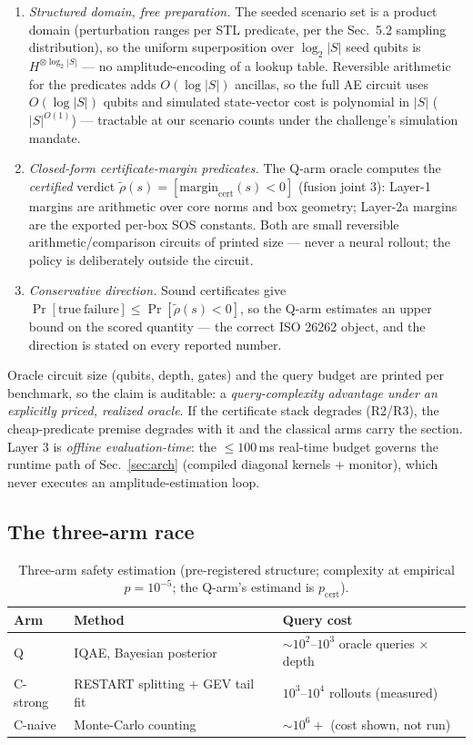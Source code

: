 \documentclass[conference,10pt]{IEEEtran}
\begin{document}
\begin{enumerate}
\item \emph{Structured domain, free preparation.} The seeded scenario set is a
product domain (perturbation ranges per STL predicate, per the Sec.~5.2
sampling distribution), so the uniform superposition over $\log_2|S|$ seed
qubits is $H^{\otimes\log_2|S|}$ --- no amplitude-encoding of a lookup table.
Reversible arithmetic for the predicates adds $O(\log|S|)$ ancillas, so the
full AE circuit uses $O(\log|S|)$ qubits and simulated state-vector cost is
polynomial in $|S|$ ($|S|^{O(1)}$) --- tractable at our scenario counts under
the challenge's simulation mandate.
\item \emph{Closed-form certificate-margin predicates.} The Q-arm oracle
computes the \emph{certified} verdict $\tilde\rho(s) =
[\mathrm{margin}_{\mathrm{cert}}(s) < 0]$ (fusion joint 3): Layer-1 margins
are arithmetic over core norms and box geometry; Layer-2a margins are the
exported per-box SOS constants. Both are small reversible
arithmetic/comparison circuits of printed size --- never a neural rollout; the
policy is deliberately outside the circuit.
\item \emph{Conservative direction.} Sound certificates give
$\Pr[\mathrm{true\ failure}] \le \Pr[\tilde\rho(s)<0]$, so the Q-arm
estimates an upper bound on the scored quantity --- the correct ISO 26262
object, and the direction is stated on every reported number.
\end{enumerate}

Oracle circuit size (qubits, depth, gates) and the query budget are printed per
benchmark, so the claim is auditable: a \emph{query-complexity advantage under
an explicitly priced, realized oracle}. If the certificate stack degrades
(R2/R3), the cheap-predicate premise degrades with it and the classical arms
carry the section. Layer 3 is \emph{offline evaluation-time}: the $\le 100$\,ms
real-time budget governs the runtime path of Sec.~\ref{sec:arch} (compiled
diagonal kernels + monitor), which never executes an amplitude-estimation loop.

\subsection{The three-arm race}
\begin{table}[!t]
\caption{Three-arm safety estimation (pre-registered structure; complexity at
empirical $p=10^{-5}$; the Q-arm's estimand is $p_{\mathrm{cert}}$).}
\label{tab:threearm}
\centering
\small
\begin{tabular}{@{}lll@{}}
\toprule
\textbf{Arm} & \textbf{Method} & \textbf{Query cost} \\
\midrule
Q & IQAE, Bayesian posterior~\cite{iqae,tabarraei} & $\sim 10^2$--$10^3$ oracle queries $\times$ depth \\
C-strong & RESTART splitting + GEV tail fit~\cite{restart} & $10^3$--$10^4$ rollouts (measured) \\
C-naive & Monte-Carlo counting & $\sim 10^6{+}$ (cost shown, not run) \\
\bottomrule
\end{tabular}
\end{table}
\end{document}
